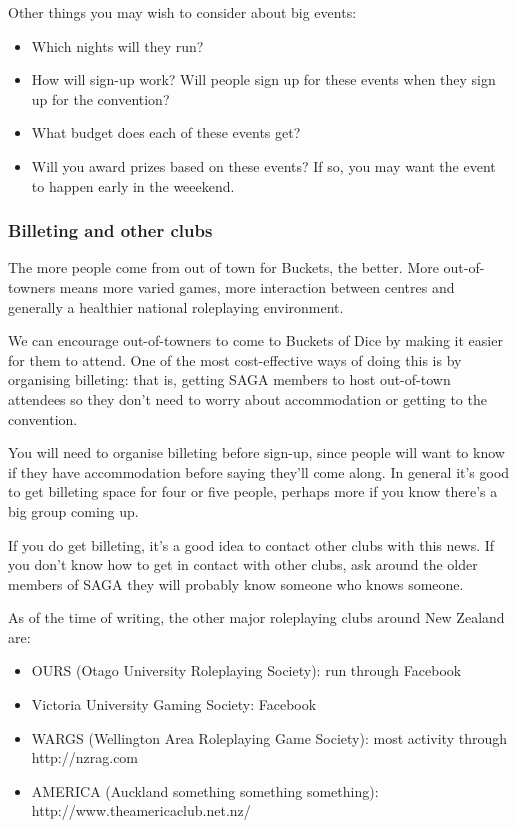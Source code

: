Other things you may wish to consider about big events:

\begin{itemize}
  \item Which nights will they run?
  \item How will sign-up work? Will people sign up for these events when they sign up for the convention?
  \item What budget does each of these events get?
  \item Will you award prizes based on these events? If so, you may want the event to happen early in the weeekend.
\end{itemize}

\subsubsection{Billeting and other clubs}

The more people come from out of town for Buckets, the better. More out-of-towners means more varied games, more interaction between centres and generally a healthier national roleplaying environment.

We can encourage out-of-towners to come to Buckets of Dice by making it easier for them to attend. One of the most cost-effective ways of doing this is by organising billeting: that is, getting SAGA members to host out-of-town attendees so they don't need to worry about accommodation or getting to the convention.

You will need to organise billeting before sign-up, since people will want to know if they have accommodation before saying they'll come along. In general it's good to get billeting space for four or five people, perhaps more if you know there's a big group coming up.

If you do get billeting, it's a good idea to contact other clubs with this news. If you don't know how to get in contact with other clubs, ask around the older members of SAGA  they will probably know someone who knows someone.

As of the time of writing, the other major roleplaying clubs around New Zealand are:

\begin{itemize}
  \item OURS (Otago University Roleplaying Society): run through Facebook
  \item Victoria University Gaming Society: Facebook
  \item WARGS (Wellington Area Roleplaying Game Society): most activity through http://nzrag.com
  \item AMERICA (Auckland something something something): http://www.theamericaclub.net.nz/
\end{itemize}

